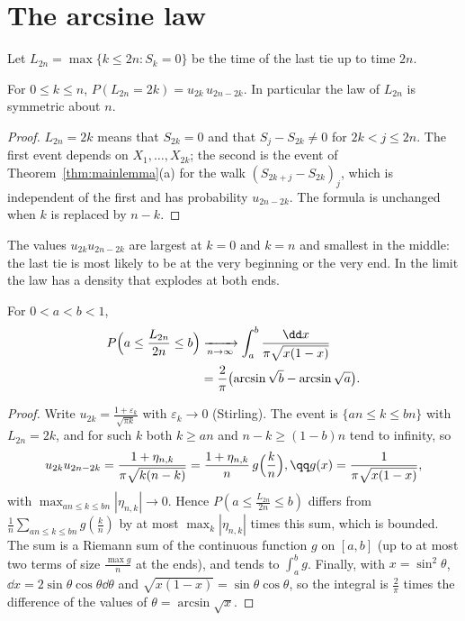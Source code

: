 \section{The arcsine law}\label{sec:arcsine}

Let $L_{2n}=\max\{k\le2n:S_k=0\}$ be the time of the last tie up to time $2n$.

\begin{theorem}\label{thm:arcsine}
For $0\le k\le n$, $P(L_{2n}=2k)=u_{2k}\,u_{2n-2k}$. In particular the law of $L_{2n}$ is symmetric about $n$.
\end{theorem}
\begin{proof}
$L_{2n}=2k$ means that $S_{2k}=0$ and that $S_j-S_{2k}\ne0$ for $2k<j\le2n$. The first event depends on $X_1,\dots,X_{2k}$; the second
is the event of Theorem~\ref{thm:mainlemma}(a) for the walk $(S_{2k+j}-S_{2k})_j$, which is independent of the first and has probability
$u_{2n-2k}$. The formula is unchanged when $k$ is replaced by $n-k$.
\end{proof}

The values $u_{2k}u_{2n-2k}$ are largest at $k=0$ and $k=n$ and smallest in the middle: the last tie is most likely to be
at the very beginning or the very end. In the limit the law has a density that explodes at both ends.

\begin{theorem}\label{thm:arcsinelimit}
For $0<a<b<1$,
\[
\begin{aligned}P\Bigl(a\le\frac{L_{2n}}{2n}\le b\Bigr)&\xrightarrow[n\to\infty]{}\int_a^b\frac{\dd x}{\pi\sqrt{x(1-x)}}\\&=\frac2\pi\bigl(\arcsin\sqrt b-\arcsin\sqrt a\bigr).\end{aligned}
\]
\end{theorem}
\begin{proof}
Write $u_{2k}=\frac{1+\varepsilon_k}{\sqrt{\pi k}}$ with $\varepsilon_k\to0$ (Stirling). The event is $\{an\le k\le bn\}$ with $L_{2n}=2k$, and for such $k$ both $k\ge an$
and $n-k\ge(1-b)n$ tend to infinity, so
\[
\begin{gathered}u_{2k}u_{2n-2k}=\frac{1+\eta_{n,k}}{\pi\sqrt{k(n-k)}}=\frac{1+\eta_{n,k}}n\,g\Bigl(\frac kn\Bigr),\qq g(x)=\frac1{\pi\sqrt{x(1-x)}},\end{gathered}
\]
with $\max_{an\le k\le bn}|\eta_{n,k}|\to0$. Hence $P(a\le\frac{L_{2n}}{2n}\le b)$ differs from $\frac1n\sum_{an\le k\le bn}g(\frac kn)$ by at most $\max_k|\eta_{n,k}|$ times
this sum, which is bounded. The sum is a Riemann sum of the continuous function $g$ on $[a,b]$ (up to at most two
terms of size $\frac{\max g}n$ at the ends), and tends to $\int_a^bg$. Finally, with $x=\sin^2\theta$, $\dd x=2\sin\theta\cos\theta\dd\theta$ and
$\sqrt{x(1-x)}=\sin\theta\cos\theta$, so the integral is $\frac2\pi$ times the difference of the values of $\theta=\arcsin\sqrt x$.
\end{proof}

